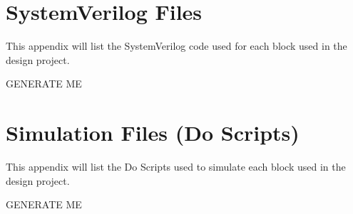 \documentclass[a4paper]{article}
\begin{document}
\clearpage



\appendix
\section{SystemVerilog Files}
This appendix will list the SystemVerilog code used for each block used in the design project.

GENERATE ME



\clearpage




\section{Simulation Files (Do Scripts)}
This appendix will list the Do Scripts used to simulate each block used in the design project.

GENERATE ME
\end{document}
